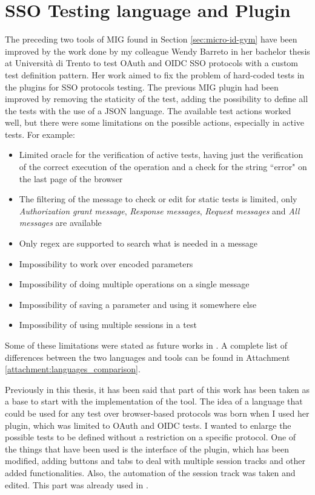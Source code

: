 \section{SSO Testing language and Plugin}
The preceding two tools of MIG found in Section \ref{sec:micro-id-gym} have been improved by the work done by my colleague Wendy Barreto \cite{wendy_barreto} in her bachelor thesis at Università di Trento to test \gls{OAuth} and \gls{OIDC} SSO protocols with a custom test definition pattern. Her work aimed to fix the problem of hard-coded tests in the plugins for SSO protocols testing. The previous MIG plugin had been improved by removing the staticity of the test, adding the possibility to define all the tests with the use of a JSON language.
The available test actions worked well, but there were some limitations on the possible actions, especially in active tests. For example:
\begin{itemize}
    \item Limited oracle for the verification of active tests, having just the verification of the correct execution of the operation and a check for the string ``error" on the last page of the browser
    \item The filtering of the message to check or edit for static tests is limited, only \textit{Authorization grant message}, \textit{Response messages}, \textit{Request messages} and \textit{All messages} are available
    \item Only regex are supported to search what is needed in a message
    \item Impossibility to work over encoded parameters
    \item Impossibility of doing multiple operations on a single message
    \item Impossibility of saving a parameter and using it somewhere else
    \item Impossibility of using multiple sessions in a test
\end{itemize}
Some of these limitations were stated as future works in \cite{wendy_barreto}. A complete list of differences between the two languages and tools can be found in Attachment \ref{attachment:languages_comparison}.

Previously in this thesis, it has been said that part of this work has been taken as a base to start with the implementation of the tool. The idea of a language that could be used for any test over browser-based protocols was born when I used her plugin, which was limited to \gls{OAuth} and \gls{OIDC} tests. I wanted to enlarge the possible tests to be defined without a restriction on a specific protocol. 
One of the things that have been used is the interface of the plugin, which has been modified, adding buttons and tabs to deal with multiple \gls{session track}s and other added functionalities. Also, the automation of the \gls{session track} was taken and edited. This part was already used in \cite{claudio_grisenti,stefano_facchini}.



